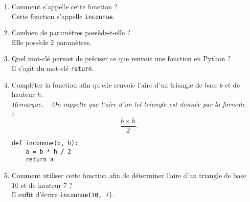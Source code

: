 \documentclass[a4paper,dvipsnames]{article}
\begin{document}
\begin{enumerate}
  \item Comment s'appelle cette fonction ?\\
    {\color{red}Cette fonction s'appelle \texttt{inconnue}.}
  \item Combien de paramètres possède-t-elle ?\\
    {\color{red}Elle possède 2 paramètres.}
  \item Quel mot-clé permet de préciser ce que renvoie une fonction en Python ?\\
    {\color{red}Il s'agit du mot-clé \texttt{return}.}
  \item Compléter la fonction afin qu'elle renvoie l'aire d'un triangle de base $b$ et de hauteur $h$.\\
    \textit{Remarque. -- On rappelle que l'aire d'un tel triangle est donnée par la formule :
      \[\dfrac{b\times h}{2}.\]
  }
\begin{verbatim}
def inconnue(b, h):
    a = b * h / 2
    return a
\end{verbatim}
\item Comment utiliser cette fonction afin de déterminer l'aire d'un triangle de base $10$ et de hauteur $7$ ?\\
  {\color{red}Il suffit d'écrire \texttt{inconnue(10, 7)}.}
\end{enumerate}
\end{document}
